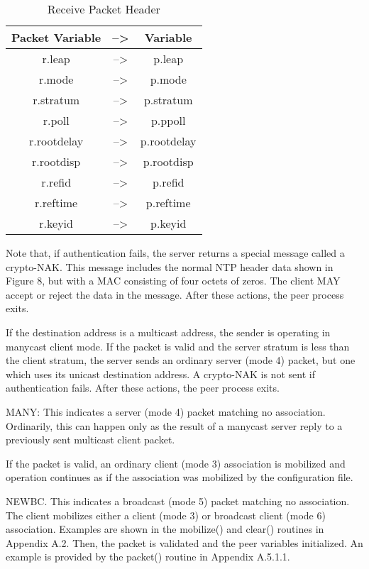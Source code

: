 \begin{table}[htb]
\center
\begin{tabular}{c | c | c}
Packet Variable & --> & Variable \\
\hline
\hline
r.leap & --> & p.leap \\
r.mode & --> & p.mode \\
r.stratum & --> & p.stratum \\
r.poll & --> & p.ppoll \\
r.rootdelay & --> & p.rootdelay \\
r.rootdisp & --> & p.rootdisp \\
r.refid & --> & p.refid \\
r.reftime & --> & p.reftime \\
r.keyid & --> & p.keyid \\
\hline
\end{tabular}
\label{receive_packet_header}
\caption{Receive Packet Header}
\end{table}

Note that, if authentication fails, the server returns a special
message called a crypto-NAK. This message includes the normal NTP
header data shown in Figure 8, but with a MAC consisting of four
octets of zeros. The client MAY accept or reject the data in the
message. After these actions, the peer process exits.

If the destination address is a multicast address, the sender is
operating in manycast client mode. If the packet is valid and the
server stratum is less than the client stratum, the server sends an
ordinary server (mode 4) packet, but one which uses its unicast
destination address. A crypto-NAK is not sent if authentication
fails. After these actions, the peer process exits.

MANY: This indicates a server (mode 4) packet matching no
association. Ordinarily, this can happen only as the result of a
manycast server reply to a previously sent multicast client packet.

If the packet is valid, an ordinary client (mode 3) association is
mobilized and operation continues as if the association was mobilized
by the configuration file.

NEWBC. This indicates a broadcast (mode 5) packet matching no
association. The client mobilizes either a client (mode 3) or
broadcast client (mode 6) association. Examples are shown in the
mobilize() and clear() routines in Appendix A.2. Then, the packet is
validated and the peer variables initialized. An example is provided
by the packet() routine in Appendix A.5.1.1.

